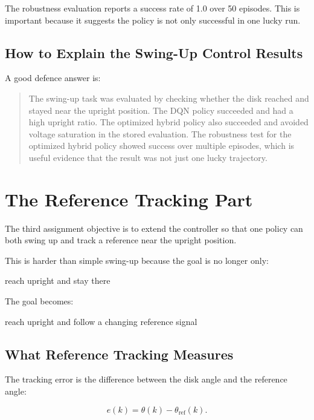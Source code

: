 \documentclass[11pt,a4paper]{article}
\begin{document}
The robustness evaluation reports a success rate of 1.0 over 50 episodes.
This is important because it suggests the policy is not only successful in one lucky run.

\subsection{How to Explain the Swing-Up Control Results}

A good defence answer is:

\begin{quote}
The swing-up task was evaluated by checking whether the disk reached and stayed near the upright position.
The DQN policy succeeded and had a high upright ratio.
The optimized hybrid policy also succeeded and avoided voltage saturation in the stored evaluation.
The robustness test for the optimized hybrid policy showed success over multiple episodes, which is useful evidence that the result was not just one lucky trajectory.
\end{quote}

\section{The Reference Tracking Part}

The third assignment objective is to extend the controller so that one policy can both swing up and track a reference near the upright position.

This is harder than simple swing-up because the goal is no longer only:

\begin{center}
reach upright and stay there
\end{center}

The goal becomes:

\begin{center}
reach upright and follow a changing reference signal
\end{center}

\subsection{What Reference Tracking Measures}

The tracking error is the difference between the disk angle and the reference angle:

\begin{equation}
e(k) = \theta(k) - \theta_{\mathrm{ref}}(k).
\end{equation}
\end{document}
